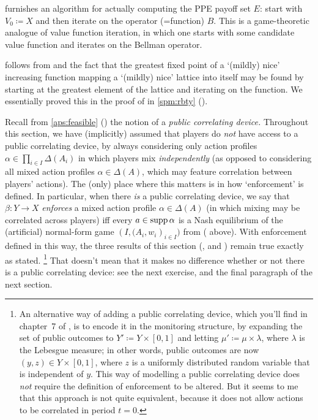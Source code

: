  furnishes an algorithm for actually computing the PPE payoff set $E$: start with $V_0 \coloneqq X$ and then iterate on the operator (=function) $B$. This is a game-theoretic analogue of value function iteration, in which one starts with some candidate value function and iterates on the Bellman operator.

 follows from  and the fact that the greatest fixed point of a `(mildly) nice' increasing function mapping a `(mildly) nice' lattice into itself may be found by starting at the greatest element of the lattice and iterating on the function. We essentially proved this in the proof of  in \cref{spm:rbty} ().

\begin{remark}
	\label{remark:aps_randomisation}
	Recall from \cref{aps:feasible} () the notion of a \emph{public correlating device.} Throughout this section, we have (implicitly) assumed that players do \emph{not} have access to a public correlating device, by always considering only action profiles $\alpha \in \prod_{i \in I} \Delta(A_i)$ in which players mix \emph{independently} (as opposed to considering all mixed action profiles $\alpha \in \Delta(A)$, which may feature correlation between players' actions). The (only) place where this matters is in how `enforcement' is defined. In particular, when there \emph{is} a public correlating device, we say that $\beta : Y \to X$ \emph{enforces} a mixed action profile $\alpha \in \Delta(A)$ (in which mixing may be correlated across players) iff every $a \in \operatorname*{supp} \alpha$ is a Nash equilibrium of the (artificial) normal-form game $\left(I,(A_i,w_i\right)_{i \in I})$ from  ( above). With enforcement defined in this way, the three results of this section (,  and ) remain true exactly as stated.%
		\footnote{An alternative way of adding a public correlating device, which you'll find in chapter~7 of \textcite{MailathSamuelson2006}, is to encode it in the monitoring structure, by expanding the set of public outcomes to $Y' \coloneqq Y \times [0,1]$ and letting $\mu' \coloneqq \mu \times \lambda$, where $\lambda$ is the Lebesgue measure; in other words, public outcomes are now $(y,z) \in Y \times [0,1]$, where $z$ is a uniformly distributed random variable that is independent of $y$. This way of modelling a public correlating device does \emph{not} require the definition of enforcement to be altered. But it seems to me that this approach is not quite equivalent, because it does not allow actions to be correlated in period $t=0$.}
	That doesn't mean that it makes no difference whether or not there is a public correlating device: see the next exercise, and the final paragraph of the next section.
\end{remark}

